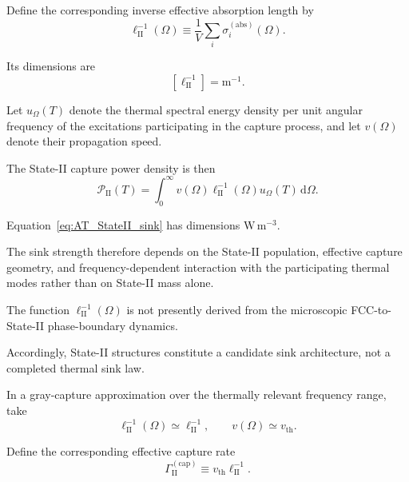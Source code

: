 Define the corresponding inverse effective absorption length by
\begin{equation}
    \ell_{\mathrm{II}}^{-1}(\Omega)
    \equiv
    \frac{1}{V}
    \sum_i
    \sigma_i^{(\mathrm{abs})}(\Omega).
    \label{eq:AT_StateII_inverse_absorption_length}
\end{equation}

Its dimensions are
\begin{equation}
    \left[
        \ell_{\mathrm{II}}^{-1}
    \right]
    =
    \mathrm{m^{-1}}.
\end{equation}

Let
\(u_\Omega(T)\)
denote the thermal spectral energy density per unit angular frequency of the
excitations participating in the capture process, and let
\(v(\Omega)\)
denote their propagation speed.

The State-II capture power density is then
\begin{equation}
    \mathcal P_{\mathrm{II}}(T)
    =
    \int_0^\infty
    v(\Omega)
    \ell_{\mathrm{II}}^{-1}(\Omega)
    u_\Omega(T)
    \,\mathrm d\Omega.
    \label{eq:AT_StateII_sink}
\end{equation}

Equation~\eqref{eq:AT_StateII_sink}
has dimensions
\(\mathrm{W\,m^{-3}}\).

The sink strength therefore depends on the State-II population, effective
capture geometry, and frequency-dependent interaction with the participating
thermal modes rather than on State-II mass alone.

The function
\(\ell_{\mathrm{II}}^{-1}(\Omega)\)
is not presently derived from the microscopic FCC-to-State-II phase-boundary
dynamics.

Accordingly, State-II structures constitute a candidate sink architecture,
not a completed thermal sink law.

In a gray-capture approximation over the thermally relevant frequency range,
take
\begin{equation}
    \ell_{\mathrm{II}}^{-1}(\Omega)
    \simeq
    \ell_{\mathrm{II}}^{-1},
    \qquad
    v(\Omega)
    \simeq
    v_{\mathrm{th}}.
    \label{eq:AT_gray_capture_approximation}
\end{equation}

Define the corresponding effective capture rate
\begin{equation}
    \Gamma_{\mathrm{II}}^{(\mathrm{cap})}
    \equiv
    v_{\mathrm{th}}
    \ell_{\mathrm{II}}^{-1}.
    \label{eq:AT_StateII_capture_rate}
\end{equation}

